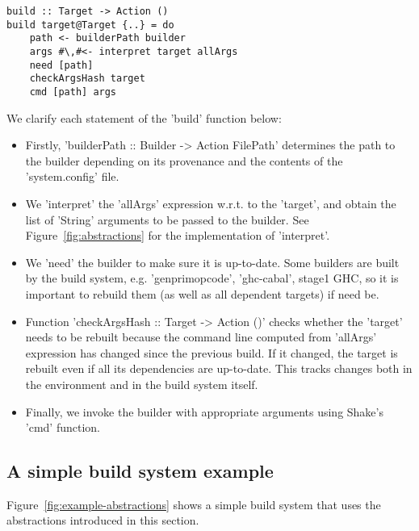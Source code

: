 \begin{lstlisting}
build :: Target -> Action ()
build target@Target {..} = do
    path <- builderPath builder
    args #\,#<- interpret target allArgs
    need [path]
    checkArgsHash target
    cmd [path] args
\end{lstlisting}

\noindent We clarify each statement of the \lst'build' function below:
\begin{itemize}
  \item Firstly, \lst'builderPath :: Builder -> Action FilePath' determines the
  path to the builder depending on its provenance and the contents of the
  \lst'system.config' file.
  \item We \lst'interpret' the \lst'allArgs' expression w.r.t. to the
  \lst'target', and obtain the list of \lst'String' arguments to be passed to
  the builder. See Figure~\ref{fig:abstractions} for the implementation of
  \lst'interpret'.
  \item We \lst'need' the builder to make sure it is up-to-date. Some builders
  are built by the build system, e.g. \lst'genprimopcode',
  \lst'ghc-cabal', stage1 GHC, so it is important to rebuild them (as well as
  all dependent targets) if need be.
  \item Function \lst'checkArgsHash :: Target -> Action ()' checks whether the
  \lst'target' needs to be rebuilt because the command line computed from
  \lst'allArgs' expression has changed since the previous build. If it changed,
  the target is rebuilt even if all its dependencies are up-to-date. This tracks
  changes both in the environment and in the build system itself.
  \item Finally, we invoke the builder with appropriate arguments using Shake's
  \lst'cmd' function.
\end{itemize}

\subsection{A simple build system example}

Figure~\ref{fig:example-abstractions} shows a simple build system that uses the
abstractions introduced in this section.

